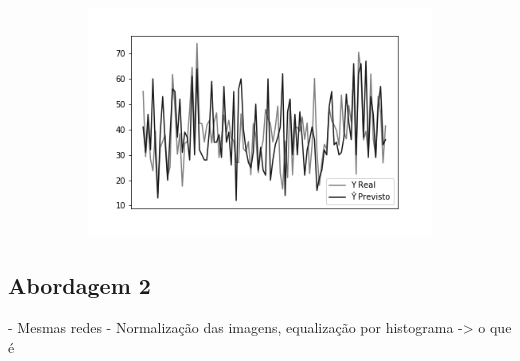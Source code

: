 \begin{figure}[hb!]
\begin{subfigure}[hb]{0.5\linewidth}
    \label{fig:redeneuralbiologica}
    \includegraphics[width=\linewidth]{img/graficos-fase2/fig-reta-dif-lenet-relu-data-augmentation-21.png}%
  \end{subfigure}%
\end{figure}

\subsection{Abordagem 2}

- Mesmas redes
- Normalização das imagens, equalização por histograma -> o que é
